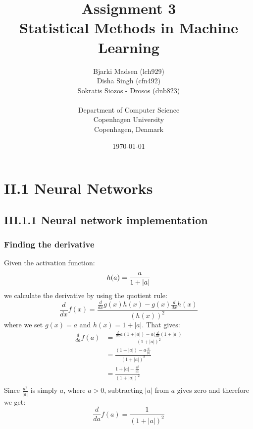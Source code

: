 \documentclass[12pt]{article}
\newcommand{\assignmentname}{Assignment 3}
\newcommand{\coursename}{Statistical Methods in Machine Learning}
\newcommand{\studentnameOne}{Bjarki Madsen (lch929)}
\newcommand{\studentnameTwo}{Disha Singh (cfn492)}
\newcommand{\studentnameThree}{Sokratis Siozos - Drosos (dnb823)}
\newcommand{\department}{Department of Computer Science}
\newcommand{\institution}{Copenhagen University}
\newcommand{\location}{Copenhagen, Denmark}
\begin{document}
\renewcommand\refname{References}

\title{\assignmentname \\ {\Large {\textsc \coursename}}}
\author{
        \studentnameOne \\
        \studentnameTwo \\
        \studentnameThree \\ \\
                \department \\
        \institution \\
        \location
}
\date{\today}

\maketitle
\thispagestyle{empty}

\pagebreak

\section*{II.1 Neural Networks}

  \subsection*{III.1.1 Neural network implementation}

    \subsubsection*{Finding the derivative}

      Given the activation function:
        $$h(a) = \frac{a}{1 + |a|} \\$$
      we calculate the derivative by using the quotient rule:
        $$\frac{d}{dx}f(x) = \frac{\frac{d}{dx}g(x)h(x) - g(x)\frac{d}{dx}h(x)}{(h(x))^2}$$
      where we set $g(x) = a$ and $h(x) = 1 + |a|$. That gives:
        \begin{align*}
          \frac{d}{da}f(a) &= \frac{\frac{d}{da}a(1+|a|) - a(\frac{d}{da}(1 + |a|)}{(1+|a|)^2} \\
          &= \frac{(1 + |a|) - a\frac{a}{|a|}}{(1+|a|)^2} \\
          &= \frac{1 + |a| - \frac{a^2}{|a|}}{(1+|a|)^2} \\
        \end{align*}
      Since $\frac{a^2}{|a|}$ is simply $a$, where $a > 0$, subtracting $|a|$ from $a$ gives zero and therefore we get:
        $$\frac{d}{da}f(a) = \frac{1}{(1+|a|)^2}$$
\end{document}
